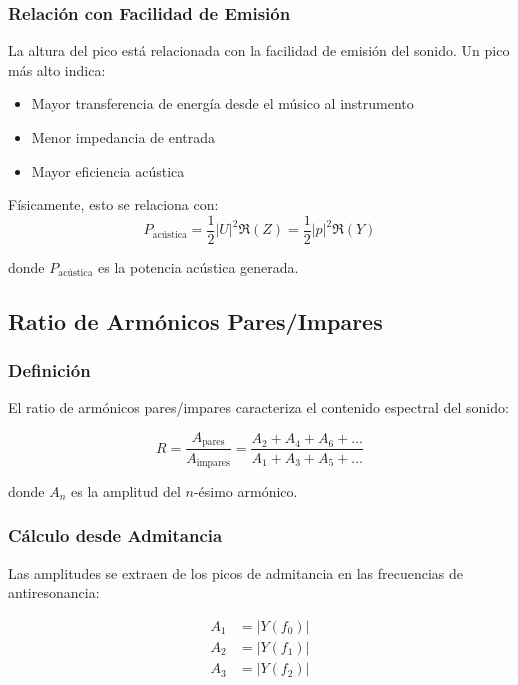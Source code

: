 \documentclass[12pt,a4paper,twocolumn]{article}
\newcommand{\impedance}{Z}
\newcommand{\admittance}{Y}
\newcommand{\freqzero}{f_0}
\newcommand{\freqone}{f_1}
\newcommand{\freqtwo}{f_2}
\begin{document}
\subsubsection{Relación con Facilidad de Emisión}

La altura del pico está relacionada con la facilidad de emisión del sonido. Un pico más alto indica:

\begin{itemize}
    \item Mayor transferencia de energía desde el músico al instrumento
    \item Menor impedancia de entrada
    \item Mayor eficiencia acústica
\end{itemize}

Físicamente, esto se relaciona con:
\begin{equation}
P_{\text{acústica}} = \frac{1}{2} |U|^2 \Re(\impedance) = \frac{1}{2} |p|^2 \Re(\admittance)
\label{eq:potencia_acustica}
\end{equation}

donde $P_{\text{acústica}}$ es la potencia acústica generada.

\subsection{Ratio de Armónicos Pares/Impares}

\subsubsection{Definición}

El ratio de armónicos pares/impares caracteriza el contenido espectral del sonido:

\begin{equation}
R = \frac{A_{\text{pares}}}{A_{\text{impares}}} = \frac{A_2 + A_4 + A_6 + \ldots}{A_1 + A_3 + A_5 + \ldots}
\label{eq:harmonic_ratio}
\end{equation}

donde $A_n$ es la amplitud del $n$-ésimo armónico.

\subsubsection{Cálculo desde Admitancia}

Las amplitudes se extraen de los picos de admitancia en las frecuencias de antiresonancia:

\begin{align}
A_1 &= |\admittance(\freqzero)| \\
A_2 &= |\admittance(\freqone)| \\
A_3 &= |\admittance(\freqtwo)|
\label{eq:amplitudes_armonicos}
\end{align}
\end{document}
